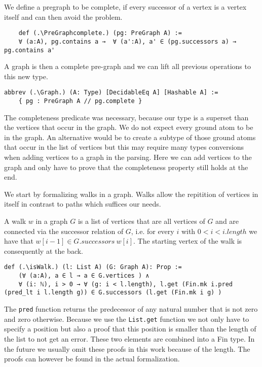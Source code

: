 We define a pregraph to be complete, if every successor of a vertex is a vertex itself and can then avoid the problem.

\begin{lstlisting}
    def (.\PreGraphcomplete.) (pg: PreGraph A) := 
    ∀ (a:A), pg.contains a →  ∀ (a':A), a' ∈ (pg.successors a) → pg.contains a'
\end{lstlisting}

A graph is then a complete pre-graph and we can lift all previous operations to this new type.
\begin{lstlisting}
abbrev (.\Graph.) (A: Type) [DecidableEq A] [Hashable A] := 
    { pg : PreGraph A // pg.complete }
\end{lstlisting}

The completeness predicate was necessary, because our type is a superset than the vertices that occur in the graph. We do not expect every ground atom to be in the graph. An alternative would be to create a subtype of those ground atoms that occur in the list of vertices but this may require many types conversions when adding vertices to a graph in the parsing. Here we can add vertices to the graph and only have to prove that the completeness property still holds at the end.

We start by formalizing walks in a graph. Walks allow the repitition of vertices in itself in contrast to paths which suffices our needs. 

A walk $w$ in a graph $G$ is a list of vertices that are all vertices of $G$ and are connected via the successor relation of $G$, i.e. for every $i$ with $0 < i < i.length$ we have that $w[i-1] \in G.successors\ w[i]$. The starting vertex of the walk is consequently at the back.

\begin{lstlisting}
def (.\isWalk.) (l: List A) (G: Graph A): Prop :=
    (∀ (a:A), a ∈ l → a ∈ G.vertices ) ∧ 
    ∀ (i: ℕ), i > 0 → ∀ (g: i < l.length), l.get (Fin.mk i.pred (pred_lt i l.length g)) ∈ G.successors (l.get (Fin.mk i g) )
\end{lstlisting}

The \lstinline|pred| function returns the predecessor of any natural number that is not zero and zero otherwise. Because we use the \lstinline|List.get| function we not only have to specify a position but also a proof that this position is smaller than the length of the list to not get an error. These two elements are combined into a Fin type. In the future we usually omit these proofs in this work because of the length. The proofs can however be found in the actual formalization.

